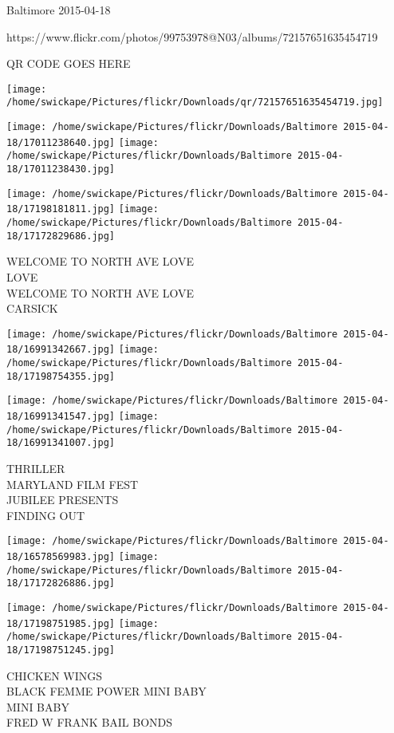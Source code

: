 \documentclass[10pt,letterpaper]{article}
\begin{document}
Baltimore 2015-04-18

https://www.flickr.com/photos/99753978@N03/albums/72157651635454719

QR CODE GOES HERE

\texttt{[image: /home/swickape/Pictures/flickr/Downloads/qr/72157651635454719.jpg]}
\pagebreak

\texttt{[image: /home/swickape/Pictures/flickr/Downloads/Baltimore 2015-04-18/17011238640.jpg]}
\texttt{[image: /home/swickape/Pictures/flickr/Downloads/Baltimore 2015-04-18/17011238430.jpg]}

\texttt{[image: /home/swickape/Pictures/flickr/Downloads/Baltimore 2015-04-18/17198181811.jpg]}
\texttt{[image: /home/swickape/Pictures/flickr/Downloads/Baltimore 2015-04-18/17172829686.jpg]}

WELCOME TO NORTH AVE LOVE\\
LOVE\\
WELCOME TO NORTH AVE LOVE\\
CARSICK\\
\pagebreak

\texttt{[image: /home/swickape/Pictures/flickr/Downloads/Baltimore 2015-04-18/16991342667.jpg]}
\texttt{[image: /home/swickape/Pictures/flickr/Downloads/Baltimore 2015-04-18/17198754355.jpg]}

\texttt{[image: /home/swickape/Pictures/flickr/Downloads/Baltimore 2015-04-18/16991341547.jpg]}
\texttt{[image: /home/swickape/Pictures/flickr/Downloads/Baltimore 2015-04-18/16991341007.jpg]}

THRILLER\\
MARYLAND FILM FEST\\
JUBILEE PRESENTS\\
FINDING OUT\\
\pagebreak

\texttt{[image: /home/swickape/Pictures/flickr/Downloads/Baltimore 2015-04-18/16578569983.jpg]}
\texttt{[image: /home/swickape/Pictures/flickr/Downloads/Baltimore 2015-04-18/17172826886.jpg]}

\texttt{[image: /home/swickape/Pictures/flickr/Downloads/Baltimore 2015-04-18/17198751985.jpg]}
\texttt{[image: /home/swickape/Pictures/flickr/Downloads/Baltimore 2015-04-18/17198751245.jpg]}

CHICKEN WINGS\\
BLACK FEMME POWER MINI BABY\\
MINI BABY\\
FRED W FRANK BAIL BONDS\\
\pagebreak
\end{document}
